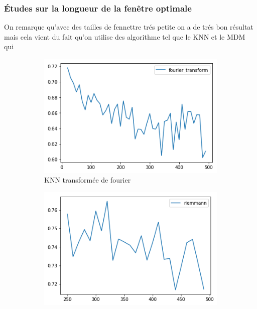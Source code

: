 \documentclass{article}[12pt]
\begin{document}
\subsubsection{Études sur la longueur de la fenêtre optimale}
On remarque qu'avec des tailles de fennettre trés petite on a de trés bon résultat mais cela vient du fait qu'on utilise des algorithme tel que le KNN et le MDM qui 
\begin{figure}
        \centering
        \begin{subfigure}[b]{0.475\textwidth}
            \centering
            \includegraphics[width=\textwidth]{images/knn_tf_f1Score.png}
            \caption[Network2]%
            {{\small KNN transformée de fourier}}    
            \label{fig:mean and std of net14}
        \end{subfigure}
        \hfill
        \begin{subfigure}[b]{0.475\textwidth}  
            \centering 
            \includegraphics[width=\textwidth]{images/riemann_cov_knn_f1Score.png}

\end{subfigure}
\end{figure}
\end{document}
